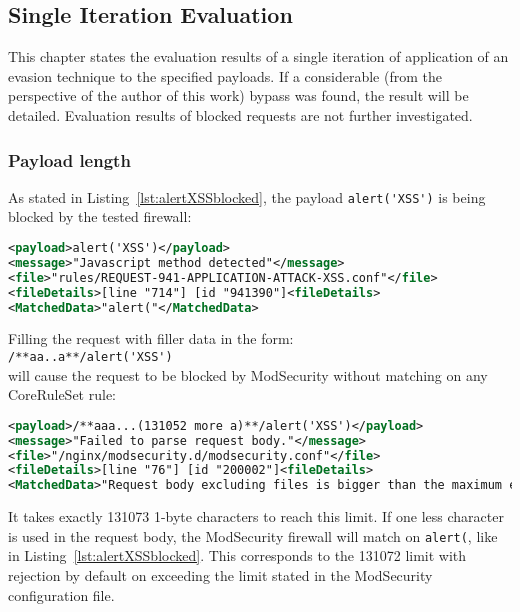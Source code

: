 \subsection{Single Iteration Evaluation}
\label{sec:singleiterationeva}
This chapter states the evaluation results of a single iteration of application of an evasion technique to the specified payloads. If a considerable (from the perspective of the author of this work) bypass was found, the result will be detailed. Evaluation results of blocked requests are not further investigated.


\subsubsection{Payload length}
\label{sec:paylensingleiter}
As stated in Listing~\ref{lst:alertXSSblocked}, the payload \verb|alert('XSS')| is being blocked by the tested firewall:

\begin{lstlisting}[style=ruleStyle, language=XML, caption=alert('XSS'), label={lst:alertXSSblocked}]
<payload>alert('XSS')</payload>
<message>"Javascript method detected"</message>
<file>"rules/REQUEST-941-APPLICATION-ATTACK-XSS.conf"</file>
<fileDetails>[line "714"] [id "941390"]<fileDetails>
<MatchedData>"alert("</MatchedData>
\end{lstlisting}

Filling the request with filler data in the form: \\
\verb|/**aa..a**/alert('XSS')| \\
will cause the request to be blocked by ModSecurity without matching on any CoreRuleSet rule:

\begin{lstlisting}[style=ruleStyle, language=XML, caption=request body bigger than maximum, label={lst:requesttoobig}]
<payload>/**aaa...(131052 more a)**/alert('XSS')</payload>
<message>"Failed to parse request body."</message>
<file>"/nginx/modsecurity.d/modsecurity.conf"</file>
<fileDetails>[line "76"] [id "200002"]<fileDetails>
<MatchedData>"Request body excluding files is bigger than the maximum expected."</MatchedData>
\end{lstlisting}

It takes exactly 131073 1-byte characters to reach this limit. If one less character is used in the request body, the ModSecurity firewall will match on \verb|alert(|, like in Listing~\ref{lst:alertXSSblocked}. This corresponds to the 131072 limit with rejection by default on exceeding the limit stated in the ModSecurity configuration file.


